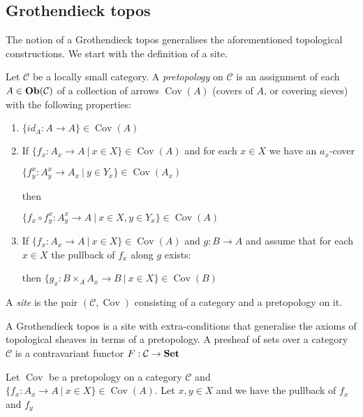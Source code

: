 \documentclass[a4paper]{article}
\theoremstyle{defin}
\theoremstyle{theorem}
\theoremstyle{claim}
\theoremstyle{prop}
\theoremstyle{lemma}
\theoremstyle{fact}
\theoremstyle{ex}
\theoremstyle{col}
\begin{document}
\subsection{Grothendieck topos}

The notion of a Grothendieck topos generalises the aforementioned topological constructions. We start with the definition of a site.

Let $\mathcal{C}$ be a locally small category. A \emph{pretopology} on $\mathcal{C}$ is an assignment of each $A \in {\bf Ob}(\mathcal{C})$ of a collection of arrows $\operatorname{Cov}(A)$ (covers of $A$, or covering sieves) with the following properties:
\begin{enumerate}
\item $\{ id_A : A \to A \} \in \operatorname{Cov}(A)$
\item If $\{ f_x : A_x \to A \: | \: x \in X \} \in \operatorname{Cov}(A)$ and for each $x \in X$ we have an $a_x$-cover
\begin{center}
$\{ f_y^x : A_y^x \to A_x \: | \: y \in Y_x \} \in \operatorname{Cov}(A_x)$
\end{center}
then
\begin{center}
$\{ f_x \circ f_y^x : A^x_y \to A \: | \: x \in X, y \in Y_x\} \in  \operatorname{Cov}(A)$
\end{center}
\item If $\{ f_x : A_x \to A \: | \: x \in X \} \in \operatorname{Cov}(A)$ and $g : B \to A$ and assume that for each $x \in X$ the pullback of $f_x$ along $g$ exists:

\centerline{
}
then $\{ g_x : B \times_A A_x \to B \:| \: x \in X\} \in \operatorname{Cov}(B)$
\end{enumerate}

A \emph{site} is the pair $(\mathcal{C}, \operatorname{Cov})$ consisting of a category and a pretopology on it.

A Grothendieck topos is a site with extra-conditions that generalise the axioms of topological sheaves in terms of a pretopology. A presheaf of sets over a category $\mathcal{C}$ is a contravariant functor $F : \mathcal{C} \to {\bf Set}$

Let $\operatorname{Cov}$ be a pretopology on a category $\mathcal{C}$ and $\{ f_x : A_x \to A \: | \: x \in X \} \in \operatorname{Cov}(A)$. Let $x, y \in X$ and we have the pullback of $f_x$ and $f_y$
\end{document}
